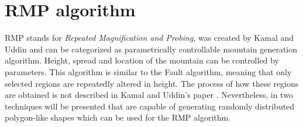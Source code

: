 \documentclass[11pt,a4paper,twoside,openright]{report}
\begin{document}
\section{RMP algorithm}
RMP stands for \emph{Repeated Magnification and Probing}, was created by Kamal and Uddin \cite{Kamal:2007:PCT:1321261.1321264} and can be categorized as parametrically controllable mountain generation algorithm. Height, spread and location of the mountain can be controlled by parameters. This algorithm is similar to the Fault algorithm, meaning that only selected regions are repeatedly altered in height. The process of how these regions are obtained is not described in Kamal and Uddin's paper \cite{Kamal:2007:PCT:1321261.1321264}. Nevertheless, in  two techniques will be presented that are capable of generating randomly distributed polygon-like shapes which can be used for the RMP algorithm.
\end{document}
